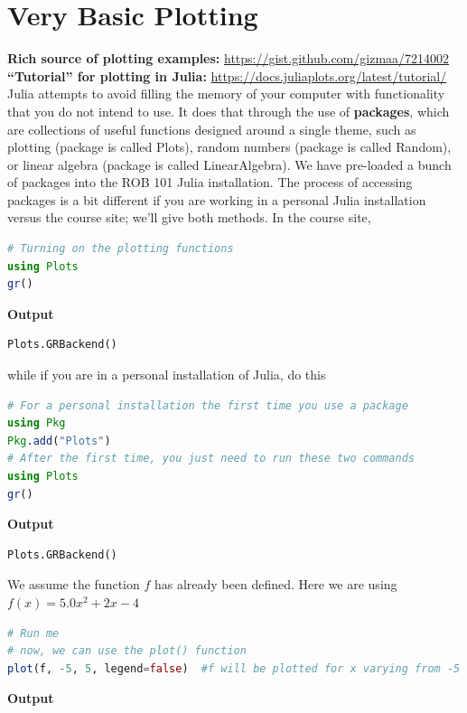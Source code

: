 \section{Very Basic Plotting}
\label{sec:basicPlotting}

\textbf{Rich source of plotting examples:} \url{https://gist.github.com/gizmaa/7214002} \\

\textbf{``Tutorial'' for plotting in Julia:} \url{https://docs.juliaplots.org/latest/tutorial/}\\

Julia attempts to avoid filling the memory of your computer with functionality that you do not intend to use. It does that through the use of \textbf{packages}, which are collections of useful functions designed around a single theme, such as plotting (package is called Plots), random numbers (package is called Random), or linear algebra (package is called LinearAlgebra). We have pre-loaded a bunch of packages into the ROB 101 Julia installation. The process of accessing packages is a bit different if you are working in a personal Julia installation versus the course site; we'll give both methods. In the course site, 
\begin{lstlisting}[language=Julia,style=mystyle]
# Turning on the plotting functions
using Plots
gr()
\end{lstlisting}
\textbf{Output} 
\begin{verbatim}
Plots.GRBackend()
\end{verbatim}
while if you are in a personal installation of Julia, do this
\begin{lstlisting}[language=Julia,style=mystyle]
# For a personal installation the first time you use a package
using Pkg
Pkg.add("Plots")
# After the first time, you just need to run these two commands
using Plots
gr()
\end{lstlisting}
\textbf{Output} 
\begin{verbatim}
Plots.GRBackend()
\end{verbatim}

We assume the function $f$ has already been defined. Here we are using $f(x) = 5.0x^2 + 2x - 4 $

\begin{lstlisting}[language=Julia,style=mystyle]
# Run me
# now, we can use the plot() function
plot(f, -5, 5, legend=false)  #f will be plotted for x varying from -5 to 5
\end{lstlisting}

\textbf{Output} 

